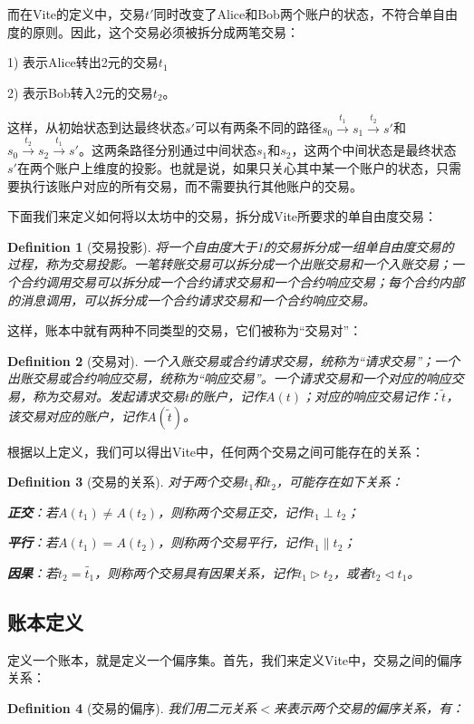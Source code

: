 \documentclass[UTF8,nofonts]{ctexart}
\newtheorem{definition}{Definition}[section]
\begin{document}
\begin{multicols}{2}
而在Vite的定义中，交易${t}'$同时改变了Alice和Bob两个账户的状态，不符合单自由度的原则。因此，这个交易必须被拆分成两笔交易：

1) 表示Alice转出2元的交易$t_{1}$

2) 表示Bob转入2元的交易$t_{2}$。

这样，从初始状态到达最终状态${s}'$可以有两条不同的路径$s_{0} \overset{t_{1}}{\rightarrow} s_{1} \overset{t_{2}}{\rightarrow} {s}'$和$s_{0} \overset{t_{2}}{\rightarrow} s_{2} \overset{t_{1}}{\rightarrow} {s}'$。这两条路径分别通过中间状态$s_{1}$和$s_{2}$，这两个中间状态是最终状态${s}'$在两个账户上维度的投影。也就是说，如果只关心其中某一个账户的状态，只需要执行该账户对应的所有交易，而不需要执行其他账户的交易。

下面我们来定义如何将以太坊中的交易，拆分成Vite所要求的单自由度交易：
\begin{definition}[交易投影]
将一个自由度大于1的交易拆分成一组单自由度交易的过程，称为交易投影。一笔转账交易可以拆分成一个出账交易和一个入账交易；一个合约调用交易可以拆分成一个合约请求交易和一个合约响应交易；每个合约内部的消息调用，可以拆分成一个合约请求交易和一个合约响应交易。
\end{definition}

这样，账本中就有两种不同类型的交易，它们被称为“交易对”：
\begin{definition}[交易对]
一个入账交易或合约请求交易，统称为“请求交易”；一个出账交易或合约响应交易，统称为“响应交易”。一个请求交易和一个对应的响应交易，称为交易对。发起请求交易$t$的账户，记作$A(t)$；对应的响应交易记作：$\widetilde{t}$，该交易对应的账户，记作$A(\widetilde{t})$。
\end{definition}

根据以上定义，我们可以得出Vite中，任何两个交易之间可能存在的关系：
\begin{definition}[交易的关系]
对于两个交易$t_{1}$和$t_{2}$，可能存在如下关系：

\textbf{正交}：若$A(t_{1}) \neq A(t_{2})$，则称两个交易正交，记作$t_{1} \perp t_{2}$；

\textbf{平行}：若$A(t_{1}) = A(t_{2})$，则称两个交易平行，记作$t_{1} \parallel t_{2}$；

\textbf{因果}：若$t_{2} = \widetilde{t_{1}}$，则称两个交易具有因果关系，记作$t_{1} \rhd t_{2}$，或者$t_{2} \lhd t_{1}$。
\end{definition}

\subsection{账本定义}
定义一个账本，就是定义一个偏序集。首先，我们来定义Vite中，交易之间的偏序关系：
\begin{definition}[交易的偏序]
我们用二元关系$<$来表示两个交易的偏序关系，有：


\end{definition}
\end{multicols}
\end{document}
